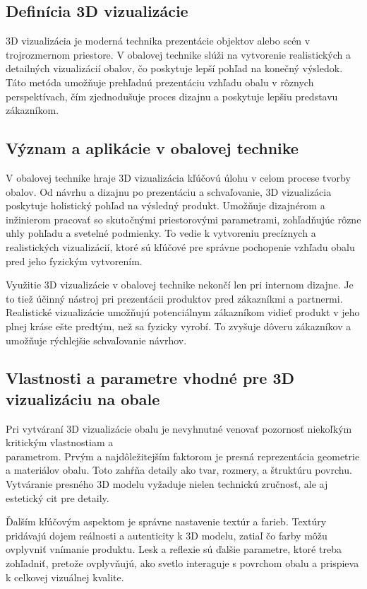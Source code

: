     \subsection{Definícia 3D vizualizácie}
      3D vizualizácia je moderná technika prezentácie objektov alebo scén v trojrozmernom priestore. V obalovej technike slúži na vytvorenie realistických a detailných vizualizácií obalov, čo poskytuje lepší pohľad na konečný výsledok. Táto metóda umožňuje prehľadnú prezentáciu vzhľadu obalu v rôznych perspektívach, čím zjednodušuje proces dizajnu a poskytuje lepšiu predstavu zákazníkom.

    \subsection{Význam a aplikácie v obalovej technike}
      V obalovej technike hraje 3D vizualizácia kľúčovú úlohu v celom procese tvorby obalov. Od návrhu a dizajnu po prezentáciu a schvaľovanie, 3D vizualizácia poskytuje holistický pohľad na výsledný produkt. Umožňuje dizajnérom a inžinierom pracovať so skutočnými priestorovými parametrami, zohľadňujúc rôzne uhly pohľadu a svetelné podmienky. To vedie k vytvoreniu precíznych a realistických vizualizácií, ktoré sú kľúčové pre správne pochopenie vzhľadu obalu pred jeho fyzickým vytvorením.

Využitie 3D vizualizácie v obalovej technike nekončí len pri internom dizajne. Je to tiež účinný nástroj pri prezentácii produktov pred zákazníkmi a partnermi. Realistické vizualizácie umožňujú potenciálnym zákazníkom vidieť produkt v jeho plnej kráse ešte predtým, než sa fyzicky vyrobí. To zvyšuje dôveru zákazníkov a umožňuje rýchlejšie schvaľovanie návrhov.

    \subsection{Vlastnosti a parametre vhodné pre 3D vizualizáciu na obale}
      Pri vytváraní 3D vizualizácie obalu je nevyhnutné venovať pozornosť niekoľkým kritickým vlastnostiam a \\ parametrom. Prvým a najdôležitejším faktorom je presná reprezentácia geometrie a materiálov obalu. Toto zahŕňa detaily ako tvar, rozmery, a štruktúru povrchu. Vytváranie presného 3D modelu vyžaduje nielen technickú zručnosť, ale aj estetický cit pre detaily.

      Ďalším kľúčovým aspektom je správne nastavenie textúr a farieb. Textúry pridávajú dojem reálnosti a autenticity k 3D modelu, zatiaľ čo farby môžu ovplyvniť vnímanie produktu. Lesk a reflexie sú ďalšie parametre, ktoré treba zohľadniť, pretože ovplyvňujú, ako svetlo interaguje s povrchom obalu a prispieva k celkovej vizuálnej kvalite.

